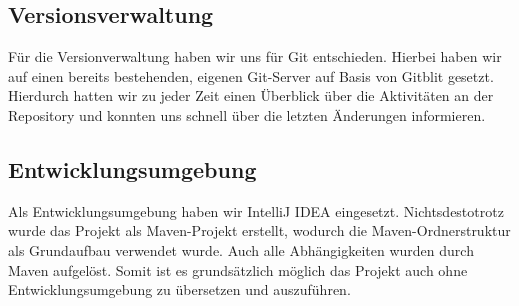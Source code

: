 \subsection{Versionsverwaltung}
Für die Versionverwaltung haben wir uns für Git entschieden. Hierbei haben wir auf einen
bereits bestehenden, eigenen Git-Server auf Basis von Gitblit gesetzt. Hierdurch hatten
wir zu jeder Zeit einen Überblick über die Aktivitäten an der Repository und konnten
uns schnell über die letzten Änderungen informieren.

\subsection{Entwicklungsumgebung}
Als Entwicklungsumgebung haben wir IntelliJ IDEA eingesetzt. Nichtsdestotrotz wurde das Projekt
als Maven-Projekt erstellt, wodurch die Maven-Ordnerstruktur als Grundaufbau verwendet wurde.
Auch alle Abhängigkeiten wurden durch Maven aufgelöst. Somit ist es grundsätzlich möglich das
Projekt auch ohne Entwicklungsumgebung zu übersetzen und auszuführen.